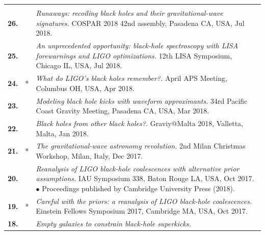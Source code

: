 {\begin{longtable}{rp{0.3cm}p{15.8cm}}
\vspace{0.05cm}\\
%
\textbf{26.} &  & \textit{Runaways: recoiling black holes and their gravitational-wave signatures.}
\newline{}
COSPAR 2018 42nd assembly, Pasadena CA, USA, Jul 2018.
\vspace{0.05cm}\\
%
\textbf{25.} &  & \textit{An unprecedented opportunity: black-hole spectroscopy with LISA forewarnings and LIGO optimizations.}
\newline{}
12th LISA Symposium, Chicago IL, USA, Jul 2018.
\vspace{0.05cm}\\
%
\textbf{24.} & * & \textit{What do LIGO's black holes remember?.}
\newline{}
April APS Meeting, Columbus OH, USA, Apr 2018.
\vspace{0.05cm}\\
%
\textbf{23.} &  & \textit{Modeling black hole kicks with waveform approximants.}
\newline{}
34rd Pacific Coast Gravity Meeting, Pasadena CA, USA, Mar 2018.
\vspace{0.05cm}\\
%
\textbf{22.} &  & \textit{Black holes from other black holes?.}
\newline{}
Graviy@Malta 2018, Valletta, Malta, Jan 2018.
\vspace{0.05cm}\\
%
\textbf{21.} & * & \textit{The gravitational-wave astronomy revolution.}
\newline{}
2nd Milan Christmas Workshop, Milan, Italy, Dec 2017.
\vspace{0.05cm}\\
%
\textbf{20.} &  & \textit{Reanalysis of LIGO black-hole coalescences with alternative prior assumptions.}
\newline{}
IAU Symposium 338, Baton Rouge LA, USA, Oct 2017.
\newline{}
\textcolor{color1}{$\bullet$} Proceedings published by Cambridge University Press (2018).
\vspace{0.05cm}\\
%
\textbf{19.} & * & \textit{Careful with the priors: a reanalysis of LIGO black-hole coalescences.}
\newline{}
Einstein Fellows Symposium 2017, Cambridge MA, USA, Oct 2017.
\vspace{0.05cm}\\
%
\textbf{18.} &  & \textit{Empty galaxies to constrain black-hole superkicks.}

\end{longtable}}
